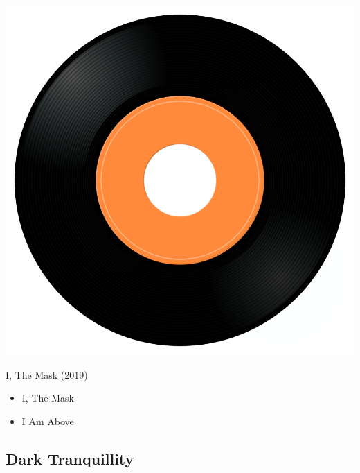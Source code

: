 \begin{minipage}[t]{0.25\textwidth}\vspace{0pt}
\captionsetup{type=figure}
\includegraphics[width=\textwidth]{Images/cover.png}
\caption*{I, The Mask (2019)}
\end{minipage}
\begin{minipage}[t]{0.25\textwidth}\vspace{0pt}
\begin{itemize}[nosep,leftmargin=1em,labelwidth=*,align=left]
	\setlength{\itemsep}{0pt}
	\item I, The Mask
	\item I Am Above
\end{itemize}
\end{minipage}


\subsection{Dark Tranquillity}

